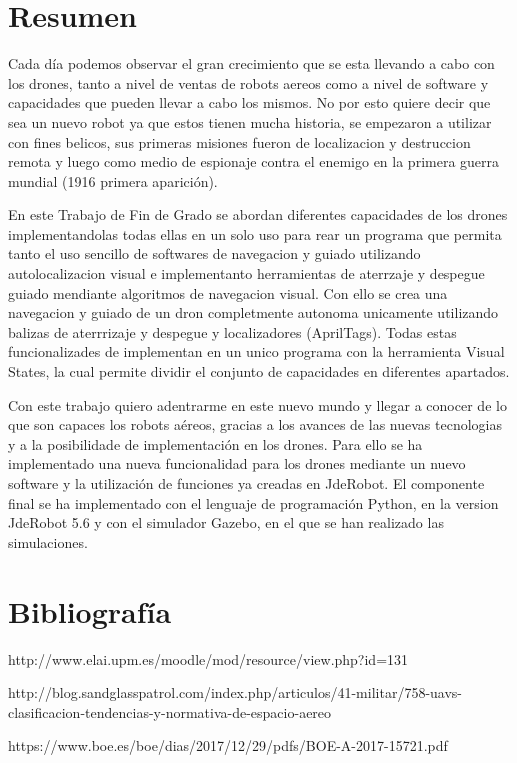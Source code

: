 \documentclass[a4paper, 12pt, oneside]{book}
\begin{document}
\chapter*{Resumen}
\hspace{1cm} Cada día podemos observar el gran crecimiento que se esta llevando a cabo con los drones, tanto a nivel de ventas de robots aereos como a nivel de software y capacidades que pueden llevar a cabo los mismos. No por esto quiere decir que sea un nuevo robot ya que estos tienen mucha historia, se empezaron a utilizar con fines belicos, sus primeras misiones fueron de localizacion y destruccion remota y luego como medio de espionaje contra el enemigo en la primera guerra mundial (1916 primera aparición).

\hspace{1cm} En este Trabajo de Fin de Grado se abordan diferentes capacidades de los drones implementandolas todas ellas en un solo uso para rear un programa que permita tanto el uso sencillo de softwares de navegacion y guiado utilizando autolocalizacion visual e implementanto herramientas de aterrzaje y despegue guiado mendiante algoritmos de navegacion visual. Con ello se crea una navegacion y guiado de un dron completmente autonoma unicamente utilizando balizas de aterrrizaje y despegue y localizadores (AprilTags). Todas estas funcionalizades de implementan en un unico programa con la herramienta Visual States, la cual permite dividir el conjunto de capacidades en diferentes apartados.

\hspace{1cm} Con este trabajo quiero adentrarme en este nuevo mundo y llegar a conocer de lo que son capaces los robots aéreos, gracias a los avances de las nuevas tecnologias y a la posibilidade de implementación en los drones. Para ello se ha implementado una nueva funcionalidad para los drones mediante un nuevo software y la utilización de funciones ya creadas en JdeRobot. El componente final se ha implementado con el lenguaje de programación Python, en la version JdeRobot 5.6 y con el simulador Gazebo, en el que se han realizado las simulaciones.

\renewcommand{\tablename}{Tabla}
\tableofcontents %

\listoffigures %
\cleardoublepage

\pagestyle{fancy}
\setlength{\parindent}{6mm}








\chapter{Bibliografía}
http://www.elai.upm.es/moodle/mod/resource/view.php?id=131

http://blog.sandglasspatrol.com/index.php/articulos/41-militar/758-uavs-clasificacion-tendencias-y-normativa-de-espacio-aereo

https://www.boe.es/boe/dias/2017/12/29/pdfs/BOE-A-2017-15721.pdf
\end{document}
